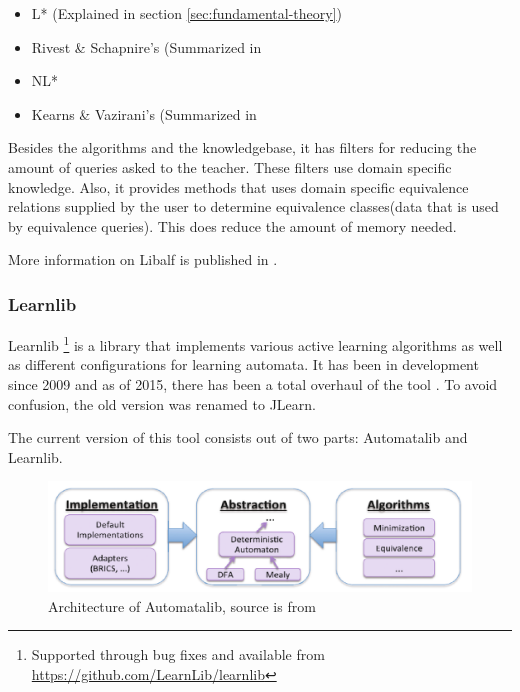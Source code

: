 \documentclass[multi,crop=false,class=article]{standalone}
\begin{document}
\begin{itemize}
	\item L* (Explained in section \ref{sec:fundamental-theory})
	\item Rivest \& Schapnire's (Summarized in 
	\item NL* \cite{Bollig2010}
	\item Kearns \& Vazirani's (Summarized in 
\end{itemize}

Besides the algorithms and the knowledgebase, it has filters for reducing the 
amount of queries asked to the teacher. These filters use domain specific 
knowledge. %
Also, it provides methods that uses domain specific equivalence relations 
supplied by the user to determine equivalence classes(data that is used by 
equivalence queries). This does reduce the amount of memory needed.

More information on Libalf is published in \cite{Bollig2010}.

\subsubsection{Learnlib}
\label{sssec:learnlib}

Learnlib  \footnote{Supported through bug fixes and available from 
\url{https://github.com/LearnLib/learnlib}} is a library that implements 
various active 
learning algorithms as well as different configurations for learning 
automata. It has been in development since 2009 \cite{Raffelt2009} and as of 
2015, there has been a total overhaul of the tool \cite{Isberner2015}. To avoid 
confusion, the old version was renamed to JLearn. 

The current version of this tool consists out of two parts: Automatalib and 
Learnlib.

\begin{figure}[!ht]
	\includegraphics[width=\textwidth]{Tool_images/automatalib_architecture.png}
	\caption{Architecture of Automatalib, source is from \cite{Isberner2015}}
	\label{fig:automatalib_arch}
\end{figure}
\end{document}
